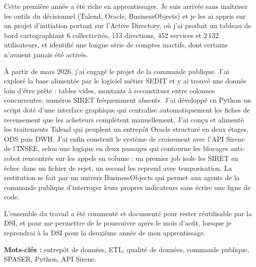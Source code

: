 \documentclass[11pt,a4paper]{article}
\begin{document}
Cette première année a été riche en apprentissages. Je suis arrivée sans maîtriser les outils du décisionnel (Talend, Oracle, BusinessObjects) et je les ai appris sur un projet d'initiation portant sur l'Active Directory, où j'ai produit un tableau de bord cartographiant 6 collectivités, 113 directions, 452 services et 2\,132 utilisateurs, et identifié une longue série de comptes inactifs, dont certains n'avaient jamais été activés.

À partir de mars 2026, j'ai engagé le projet de la commande publique. J'ai exploré la base alimentée par le logiciel métier SEDIT et y ai trouvé une donnée loin d'être prête : tables vides, montants à reconstituer entre colonnes concurrentes, numéros SIRET fréquemment absents. J'ai développé en Python un script doté d'une interface graphique qui centralise automatiquement les fiches de recensement que les acheteurs complètent manuellement. J'ai conçu et alimenté les traitements Talend qui peuplent un entrepôt Oracle structuré en deux étages, ODS puis DWH. J'ai enfin construit le système de croisement avec l'API Sirene de l'INSEE, selon une logique en deux passages qui contourne les blocages anti-robot rencontrés sur les appels en volume : un premier job isole les SIRET en échec dans un fichier de rejet, un second les reprend avec temporisation. La restitution se fait par un univers BusinessObjects qui permet aux agents de la commande publique d'interroger leurs propres indicateurs sans écrire une ligne de code.

L'ensemble du travail a été commenté et documenté pour rester réutilisable par la DSI, et pour me permettre de le poursuivre après le mois d'août, lorsque je reprendrai à la DSI pour la deuxième année de mon apprentissage.

\textbf{Mots-clés :} entrepôt de données, ETL, qualité de données, commande publique, SPASER, Python, API Sirene.

\newpage
\end{document}
